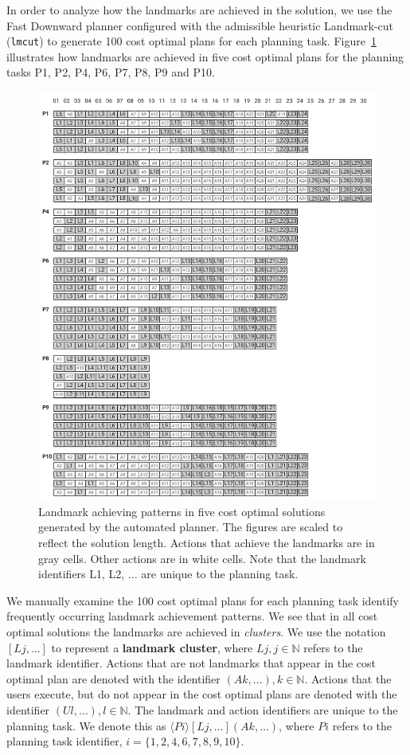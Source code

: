 In order to analyze how the landmarks are achieved in the solution, we use the Fast Downward planner configured with the admissible heuristic Landmark-cut (\texttt{lmcut}) to generate 100 cost optimal plans for each planning task.
Figure~\ref{fig:achievement} illustrates how landmarks are achieved in five cost optimal plans for the planning tasks P1, P2, P4, P6, P7, P8, P9 and P10.
\begin{figure}[tpb]
  \centering
\includegraphics[width=\columnwidth]{img/landmarks.pdf}
  \caption{Landmark achieving patterns in five cost optimal solutions generated by the automated planner. The figures are scaled to reflect the solution length. Actions that achieve the landmarks are in gray cells. Other actions are in white cells. Note that the landmark identifiers L1, L2, $\ldots$ are unique to the planning task.}
  \label{fig:achievement}
\end{figure}
We manually examine the 100 cost optimal plans for each planning task identify frequently occurring landmark achievement patterns.
We see that in all cost optimal solutions the landmarks are achieved in \textit{clusters}.
We use the notation $[ Lj, \ldots ]$ to represent a \textbf{landmark cluster}, where $Lj, j\in\mathbb{N}$ refers to the landmark identifier.
Actions that are not landmarks that appear in the cost optimal plan are denoted with the identifier $(Ak, \ldots), k\in\mathbb{N}$.
Actions that the users execute, but do not appear in the cost optimal plans are denoted with the identifier $(Ul, \ldots), l\in\mathbb{N}$.
The landmark and action identifiers are unique to the planning task.
We denote this as $\langle Pi\rangle [Lj, \ldots] (Ak, \ldots) $, where $Pi$ refers to the planning task identifier, $i=\lbrace 1, 2, 4, 6, 7, 8, 9, 10\rbrace$.

